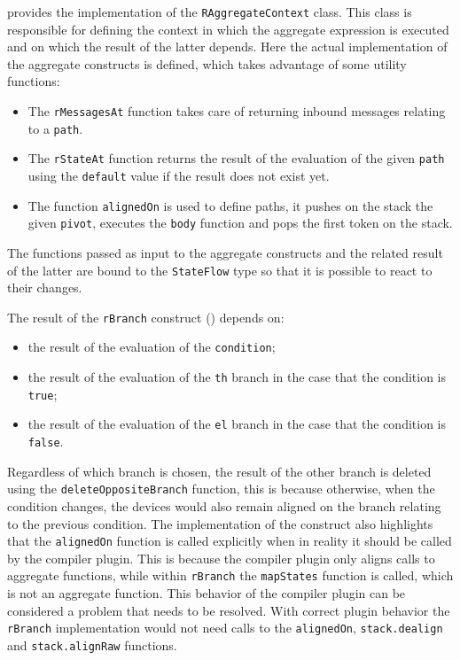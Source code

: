  provides the implementation of the \texttt{RAggregateContext} class. This class is responsible for defining the context in which the aggregate expression is executed and on which the result of the latter depends. Here the actual implementation of the aggregate constructs is defined, which takes advantage of some utility functions:

\begin{itemize}
    \item The \texttt{rMessagesAt} function takes care of returning inbound messages relating to a \texttt{path}.
    \item The \texttt{rStateAt} function returns the result of the evaluation of the given \texttt{path} using the \texttt{default} value if the result does not exist yet.
    \item The function \texttt{alignedOn} is used to define paths, it pushes on the stack the given \texttt{pivot}, executes the \texttt{body} function and pops the first token on the stack.
\end{itemize}

The functions passed as input to the aggregate constructs and the related result of the latter are bound to the \texttt{StateFlow} type so that it is possible to react to their changes.

The result of the \texttt{rBranch} construct () depends on:
\begin{itemize}
    \item the result of the evaluation of the \texttt{condition};
    \item the result of the evaluation of the \texttt{th} branch in the case that the condition is \texttt{true};
    \item the result of the evaluation of the \texttt{el} branch in the case that the condition is \texttt{false}.
\end{itemize}

Regardless of which branch is chosen, the result of the other branch is deleted using the \texttt{deleteOppositeBranch} function, this is because otherwise, when the condition changes, the devices would also remain aligned on the branch relating to the previous condition. The implementation of the construct also highlights that the \texttt{alignedOn} function is called explicitly when in reality it should be called by the compiler plugin. This is because the compiler plugin only aligns calls to aggregate functions, while within \texttt{rBranch} the \texttt{mapStates} function is called, which is not an aggregate function. This behavior of the compiler plugin can be considered a problem that needs to be resolved. With correct plugin behavior the \texttt{rBranch} implementation would not need calls to the \texttt{alignedOn}, \texttt{stack.dealign} and \texttt{stack.alignRaw} functions.

